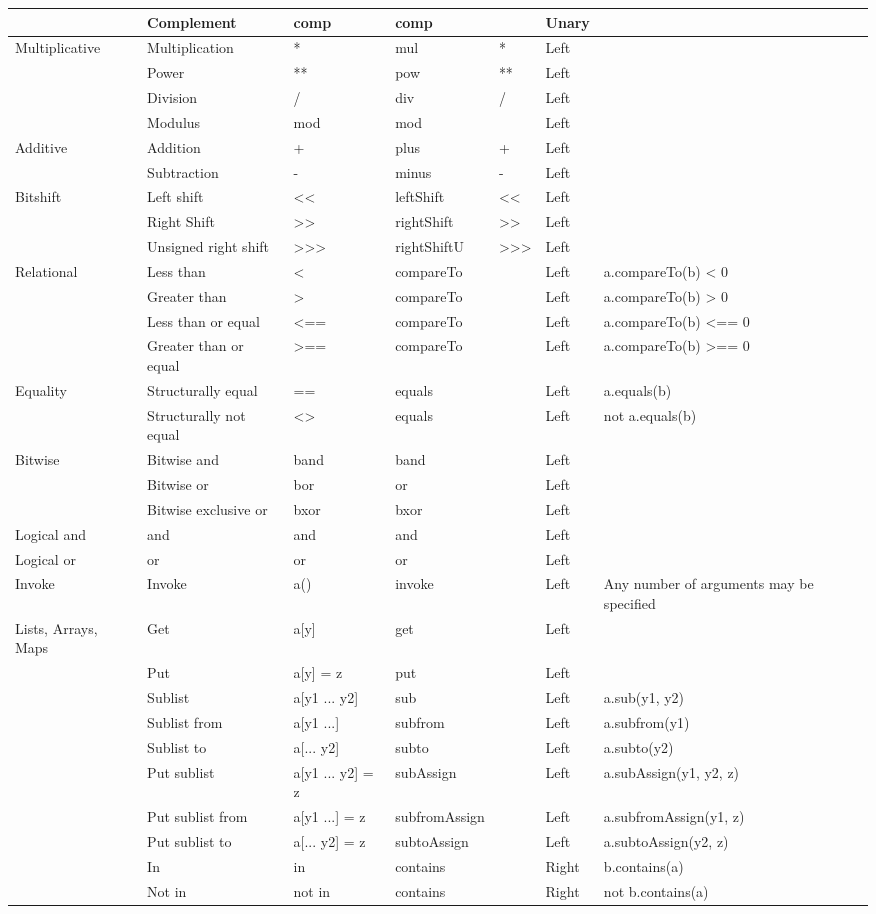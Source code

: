 \documentclass[conc-doc]{subfiles}
\begin{document}
{\begin{longtable}[hbt!]{| l | l | l | l | l | l | l | }
		&Complement&comp&comp& &Unary&\\ \hline
		Multiplicative&Multiplication&*&mul&*&Left&\\
		&Power&**&pow&**&Left&\\
		&Division&/&div&/&Left&\\
		&Modulus&mod&mod& &Left&\\ \hline
		Additive&Addition&+&plus&+&Left&\\
		&Subtraction&-&minus&-&Left&\\ \hline
		Bitshift&Left shift&<<&leftShift&<<&Left&\\
		&Right Shift&>>&rightShift&>>&Left&\\
		&Unsigned right shift&>>>&rightShiftU&>>>&Left&\\ \hline
		Relational&Less than&<&compareTo& &Left&a.compareTo(b) < 0\\
		&Greater than&>&compareTo& &Left&a.compareTo(b) > 0\\
		&Less than or equal&<==&compareTo& &Left&a.compareTo(b) <== 0\\
		&Greater than or equal&>==&compareTo& &Left&a.compareTo(b) >== 0\\ \hline
		Equality&Structurally equal&==&equals& &Left&a.equals(b)\\
		&Structurally not equal&<>&equals& &Left&not a.equals(b)\\ \hline
		Bitwise&Bitwise and&band&band& &Left&\\
		&Bitwise or&bor&or& &Left&\\
		&Bitwise exclusive or&bxor&bxor& &Left&\\ \hline
		Logical and&and&and&and& &Left&\\ \hline
		Logical or&or&or&or& &Left&\\ \hline
		Invoke&Invoke&a()&invoke& &Left&Any number of arguments may be specified\\ \hline
		Lists, Arrays, Maps&Get&a[y]&get& &Left&\\
		&Put&a[y] = z&put& &Left&\\
		&Sublist&a[y1 ... y2]&sub& &Left&a.sub(y1, y2)\\
		&Sublist from&a[y1 ...]&subfrom& &Left&a.subfrom(y1)\\
		&Sublist to&a[... y2]&subto& &Left&a.subto(y2)\\
		&Put sublist&a[y1 ... y2] = z&subAssign& &Left&a.subAssign(y1, y2, z)\\
		&Put sublist from&a[y1 ...] = z&subfromAssign& &Left&a.subfromAssign(y1, z)\\
		&Put sublist to&a[... y2] = z&subtoAssign& &Left&a.subtoAssign(y2, z)\\
		&In&in&contains& &Right&b.contains(a)\\
		&Not in&not in&contains& &Right&not b.contains(a)
		
		
	\end{longtable}
}
\end{document}
